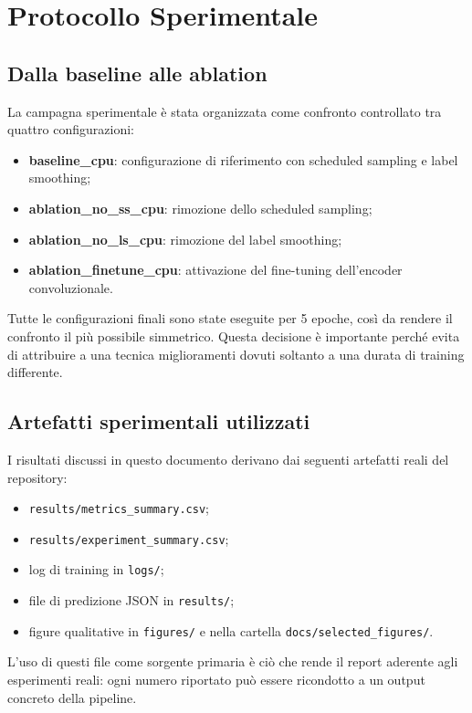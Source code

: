 \documentclass[11pt,a4paper]{report}
\begin{document}
\chapter{Protocollo Sperimentale}

\section{Dalla baseline alle ablation}

La campagna sperimentale è stata organizzata come confronto controllato tra quattro configurazioni:
\begin{itemize}[leftmargin=*]
  \item \textbf{baseline\_cpu}: configurazione di riferimento con scheduled sampling e label smoothing;
  \item \textbf{ablation\_no\_ss\_cpu}: rimozione dello scheduled sampling;
  \item \textbf{ablation\_no\_ls\_cpu}: rimozione del label smoothing;
  \item \textbf{ablation\_finetune\_cpu}: attivazione del fine-tuning dell'encoder convoluzionale.
\end{itemize}

Tutte le configurazioni finali sono state eseguite per 5 epoche, così da rendere il confronto il più possibile simmetrico. Questa decisione è importante perché evita di attribuire a una tecnica miglioramenti dovuti soltanto a una durata di training differente.

\section{Artefatti sperimentali utilizzati}

I risultati discussi in questo documento derivano dai seguenti artefatti reali del repository:
\begin{itemize}[leftmargin=*]
  \item \texttt{results/metrics\_summary.csv};
  \item \texttt{results/experiment\_summary.csv};
  \item log di training in \texttt{logs/};
  \item file di predizione JSON in \texttt{results/};
  \item figure qualitative in \texttt{figures/} e nella cartella \texttt{docs/selected\_figures/}.
\end{itemize}

L'uso di questi file come sorgente primaria è ciò che rende il report aderente agli esperimenti reali: ogni numero riportato può essere ricondotto a un output concreto della pipeline.
\end{document}
